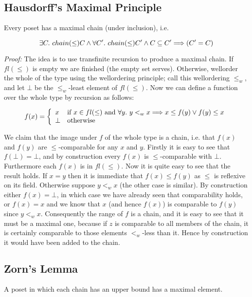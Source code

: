 \subsection{Hausdorff's Maximal Principle}

Every poset has a maximal chain (under inclusion), i.e.

$$ \exists C.\ chain(\leq) C \wedge
          \forall C'.\ chain(\leq) C' \wedge C \subseteq C' \Longrightarrow (C' = C) $$

{\em Proof:} The idea is to use transfinite recursion to produce a maximal
chain. If $fl(\leq)$ is empty we are finished (the empty set serves).
Otherwise, wellorder the whole of the type using the wellordering principle;
call this wellordering $\leq_w$, and let $\bot$ be the $\leq_w$-least element
of $fl(\leq)$. Now we can define a function over the whole type by recursion as
follows:

$$ f(x) = \left\{ \begin{array}{ll}
        x & \mbox{if $x \in fl(\leq)$ and $\forall y.\ y <_w x \Longrightarrow x \leq
f(y) \vee f(y) \leq x$}\\
     \bot & \mbox{otherwise}
                 \end{array} \right. $$

We claim that the image under $f$ of the whole type is a chain, i.e. that
$f(x)$ and $f(y)$ are $\leq$-comparable for any $x$ and $y$. Firstly it is easy
to see that $f(\bot) = \bot$, and by construction every $f(x)$ is
$\leq$-comparable with $\bot$. Furthermore each $f(x)$ is in $fl(\leq)$.
Now it is quite easy to see that the result holds. If $x = y$ then it is
immediate that $f(x) \leq f(y)$ as $\leq$ is reflexive on its field. Otherwise
suppose $y <_w x$ (the other case is similar). By construction either $f(x) =
\bot$, in which case we have already seen that comparability holds, or $f(x) =
x$ and we know that $x$ (and hence $f(x)$) is comparable to $f(y)$ since
$y <_w x$. Consequently the range of $f$ is a chain, and it is easy to see that
it must be a maximal one, because if $z$ is comparable to all members of the
chain, it is certainly comparable to those elements $<_w$-less than it. Hence
by construction it would have been added to the chain.
\subsection{Zorn's Lemma}

A poset in which each chain has an upper bound has a maximal element.

